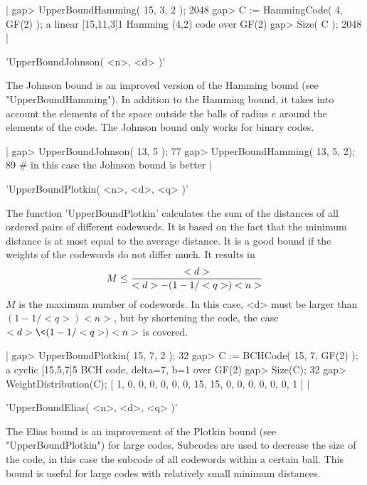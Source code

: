 |    gap> UpperBoundHamming( 15, 3, 2 );
    2048
    gap> C := HammingCode( 4, GF(2) );
    a linear [15,11,3]1 Hamming (4,2) code over GF(2)
    gap> Size( C );
    2048 |


'UpperBoundJohnson( <n>, <d> )'

The Johnson bound  is  an improved   version  of the Hamming  bound  (see
"UpperBoundHamming").   In addition to the   Hamming bound, it takes into
account the elements of the space outside the  balls of radius $e$ around
the elements of the code. The Johnson bound only works for binary codes.

|    gap> UpperBoundJohnson( 13, 5 );
    77
    gap> UpperBoundHamming( 13, 5, 2);
    89   # in this case the Johnson bound is better |


'UpperBoundPlotkin( <n>, <d>, <q> )'

The function 'UpperBoundPlotkin' calculates  the sum of the  distances of
all ordered pairs of  different codewords. It  is based on the  fact that
the  minimum distance is  at most equal to  the average distance. It is a
good bound if the weights of the codewords do not differ much. It results
in\: $$M \leq {<d> \over {<d>-(1-1/<q>)<n>}}$$  $M$ is the maximum number
of codewords.  In this case, <d>  must be larger than $(1-1/<q>)<n>$, but
by shortening the code, the case $<d> \< (1-1/<q>)<n>$ is covered.

|    gap> UpperBoundPlotkin( 15, 7, 2 );
    32
    gap> C := BCHCode( 15, 7, GF(2) );
    a cyclic [15,5,7]5 BCH code, delta=7, b=1 over GF(2)
    gap> Size(C);
    32
    gap> WeightDistribution(C);
    [ 1, 0, 0, 0, 0, 0, 0, 15, 15, 0, 0, 0, 0, 0, 0, 1 ] |


'UpperBoundElias( <n>, <d>, <q> )'

The  Elias    bound  is   an  improvement  of   the  Plotkin   bound (see
"UpperBoundPlotkin") for large codes. Subcodes  are used to decrease  the
size  of the code, in this  case  the subcode of   all codewords within a
certain ball. This bound is useful  for large codes with relatively small
minimum distances.

